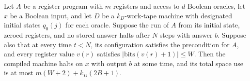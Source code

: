 \begin{theorem}
\label{Complexity.LogProg.arm_space}
\leanok
{}
Let $A$ be a register program with $m$ registers and access to $d$ Boolean oracles, let
$x$ be a Boolean input, and let $D$ be a $k_D$-work-tape machine with designated initial
states $q_0(j)$ for each oracle. Suppose the run of $A$ from its initial state, zeroed
registers, and no stored answer halts after $N$ steps with answer $b$. Suppose also that
at every time $t<N$, its configuration satisfies the precondition for $A$, and every
register value $v(r)$ satisfies $\lvert\mathrm{bits}(v(r)+1)\rvert\le W$. Then the
compiled machine halts on $x$ with output $b$ at some time, and its total space use is
at most $m(W+2)+k_D(2B+1)$.
\end{theorem}
